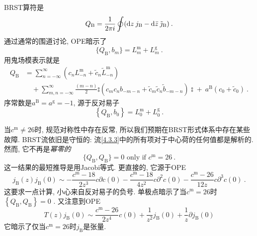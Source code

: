 BRST算符是
\begin{equation}
Q_{\mathrm{B}}=\frac{1}{2 \pi i} \oint (\mathrm{d} z\: j_{\mathrm{B}}- \mathrm{d} \bar{z} \: \tilde{\jmath}_{\mathrm{B}}) \:. \label{4.3.5}
\end{equation}
通过通常的围道讨论, OPE暗示了
\begin{equation}
\{Q_{\mathrm{B}}, b_{m}\}=L_{m}^{\mathrm{m}}+L_{m}^{\mathrm{g}} \:. \label{4.3.6}
\end{equation}
用鬼场模表示就是
\begin{align}
Q_{\mathrm{B}}&= \sum_{n=-\infty}^{\infty} (c_{n} L_{-n}^{\mathrm{m}}+\tilde{c}_{n} \tilde{L}_{-n}^{\mathrm{m}})  \nonumber \\
&\quad  +\sum_{m, n=-\infty}^{\infty} \frac{(m-n)}{2} \mathrel{\typecolon(c_{m} c_{n} b_{-m-n}+\tilde{c}_{m} \tilde{c}_{n} \tilde{b}_{-m-n})\typecolon}+\: a^{\mathrm{B}} (c_{0}+\tilde{c}_{0}) \:. \label{4.3.7}
\end{align}
序常数是$a^{\mathrm{B}}=a^{\mathrm{g}}=-1$, 源于反对易子
\begin{equation}
\left\{Q_{\mathrm{B}}, b_{0}\right\}=L_{0}^{\mathrm{m}}+L_{0}^{\mathrm{g}} \:. \label{4.3.8}
\end{equation}

当$c^{\mathrm{m}} \neq 26$时, 规范对称性中存在反常, 所以我们预期在BRST形式体系中存在某些故障. BRST流依旧是守恒的: 流\eqref{4.3.3}中的所有项对于中心荷的任何值都是解析的. 然而, 它不再是\emph{幂零的}
\begin{equation}
\{Q_{\mathrm{B}}, Q_{\mathrm{B}}\}=0 \text { only if } c^{\mathrm{m}}=26 \:. \label{4.3.9}
\end{equation}
这一结果的最短推导是用Jacobi等式. 更直接的, 它源于OPE
\begin{equation}
j_{\mathrm{B}}(z) j_{\mathrm{B}}(0) \sim-\frac{c^{\mathrm{m}}-18}{2 z^{3}} c \partial c(0)-\frac{c^{\mathrm{m}}-18}{4 z^{2}} c \partial^{2} c(0)-\frac{c^{\mathrm{m}}-26}{12 z} c \partial^{3} c(0) \:. \label{4.3.10}
\end{equation}
这要求一点计算, 小心来自反对易子的负号. 单极点暗示了当$c^{\mathrm{m}}=26$时$\left\{Q_{\mathrm{B}}, Q_{\mathrm{B}}\right\}=0$ . 又注意到OPE 
\begin{equation}
T(z) j_{\mathrm{B}}(0) \sim \frac{c^{\mathrm{m}}-26}{2 z^{4}} c(0)+\frac{1}{z^{2}} j_{\mathrm{B}}(0)+\frac{1}{z} \partial j_{\mathrm{B}}(0)
\end{equation}
它暗示了仅当$c^{\mathrm{m}}=26$时$j_{\mathrm{B}}$是张量.


